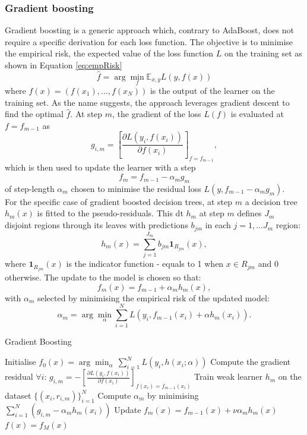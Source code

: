 \subsubsection{Gradient boosting}
Gradient boosting is a generic approach which, contrary to AdaBoost, does not require a specific derivation for each loss function. The objective is to minimise the empirical risk, the expected value of the loss function $L$ on the training set as shown in Equation \ref{eq:empRisk} 
\begin{equation}\label{eq:empRisk}
    \hat{f}  = \arg \min_f \mathbb{E}_{x,y} L(y, f(x))
\end{equation}
where $f(x) = (f(x_1), ..., f(x_N))$ is the output of the learner on the training set. As the name suggests, the approach leverages gradient descent to find the optimal $\hat{f}$. At step $m$, the gradient of the loss $L(f)$ is evaluated at $f = f_{m-1}$ as \[ g_{i,m} = \left[ \frac{\partial  L(y_i, f(x_i))}{\partial f(x_i)} \right]_{f= f_{m-1}}, \] which is then used to update the learner with a step \[ f_m = f_{m-1} - \alpha_m g_{m}\] of step-length $\alpha_m$ chosen to minimise the residual loss $L(y, f_{m-1} - \alpha_m g_{m})$. \\
For the specific case of gradient boosted decision trees, at step $m$ a decision tree $h_m(x)$ is fitted to the pseudo-residuals. This \gls{dt} $h_m$ at step $m$ defines $J_m$ disjoint regions through its leaves with predictions $b_{jm}$ in each $j = 1, ... J_m$ region: \[ h_m(x) = \sum_{j=1}^{J_m} b_{jm} \textbf{1}_{R_{jm}}(x),\] where $\textbf{1}_{R_{jm}}(x)$ is the indicator function - equals to 1 when $x \in R_{jm}$ and 0 otherwise. The update to the model is chosen so that: \[f_m(x) = f_{m-1} + \alpha_m h_m(x),\] with $\alpha_m$ selected by minimising the empirical risk of the updated model: \[ \alpha_m = \arg \min_{\alpha} \sum_{i=1}^N L(y_i, f_{m-1}(x_i) + \alpha h_m(x_i)).\]

\begin{algorithm}
    \caption{Gradient Boosting \cite{MurphyML}}
    \label{algo:gradient_boosting}
    \begin{algorithmic}
    \State Initialise $f_0(x) = \arg\min_\alpha \,\sum_{i=1}^N L(y_i, h(x_i; \alpha))$
        \State Compute the gradient residual $\forall i$: $g_{i,m} = -\left[\frac{\partial L(y_i, f(x_i))}{\partial f(x_i)}\right]_{f(x_i) = f_{m-1}(x_i)}$
        \State Train weak learner $h_m$ on the dataset $\{(x_i, r_{i,m})\}_{i=1}^N$
        \State Compute $\alpha_m$ by minimising $\sum_{i=1}^N(g_{i,m} - \alpha_m h_m(x_i))$
        \State Update $f_m(x) = f_{m-1}(x) + \nu \alpha_m h_m(x)$
    \EndFor
    \State \Return $f(x) = f_M(x)$
    \end{algorithmic}
\end{algorithm}

